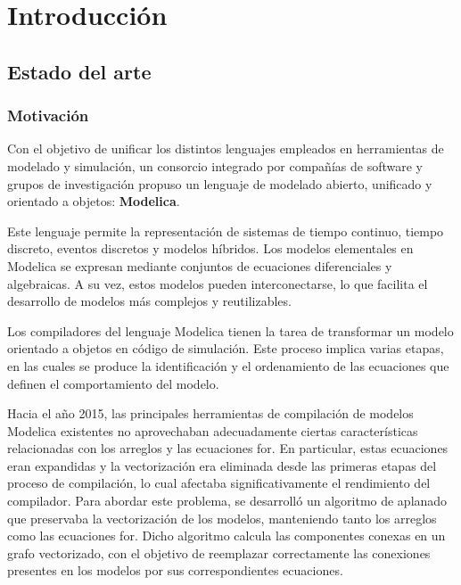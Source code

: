 
\chapter{Introducción}
\section{Estado del arte}
\subsection{Motivación}

Con el objetivo de unificar los distintos lenguajes empleados en herramientas de modelado y simulación, un consorcio integrado por compañías de software y grupos de investigación propuso un lenguaje de modelado abierto, unificado y orientado a objetos: \textbf{Modelica}\cite{fritzson1998modelica}\cite{fritzson2002modelica}.

Este lenguaje permite la representación de sistemas de tiempo continuo, tiempo discreto, eventos discretos y modelos híbridos. Los modelos elementales en Modelica se expresan mediante conjuntos de ecuaciones diferenciales y algebraicas. A su vez, estos modelos pueden interconectarse, lo que facilita el desarrollo de modelos más complejos y reutilizables.

Los compiladores del lenguaje Modelica tienen la tarea de transformar un modelo orientado a objetos en código de simulación. Este proceso implica varias etapas, en las cuales se produce la identificación y el ordenamiento de las ecuaciones que definen el comportamiento del modelo. 

Hacia el año 2015, las principales herramientas de compilación de modelos Modelica existentes \cite{fritzson2020openmodelica}\cite{dempsey2006dymola}\cite{rozhdestvensky2020description} no aprovechaban adecuadamente ciertas características relacionadas con los arreglos y las ecuaciones for. En particular, estas ecuaciones eran expandidas y la vectorización era eliminada desde las primeras etapas del proceso de compilación, lo cual afectaba significativamente el rendimiento del compilador.
Para abordar este problema, se desarrolló un algoritmo de aplanado  \cite{bergero2015efficient} que preservaba la vectorización de los modelos, manteniendo tanto los arreglos como las ecuaciones for. Dicho algoritmo calcula las componentes conexas en un grafo vectorizado, con el objetivo de reemplazar correctamente las conexiones presentes en los modelos por sus correspondientes ecuaciones.


